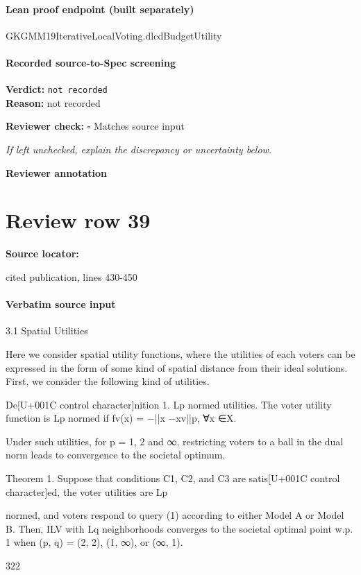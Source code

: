 \documentclass[10pt]{article}
\newcommand{\reviewerbox}{%
  \par\noindent\fbox{\parbox{0.96\linewidth}{\rule{0pt}{0.38in}}}\par
}
\newcommand{\reviewmatch}[1]{%
  \par\noindent\textbf{Reviewer check:} $\square$\; #1\par
  \noindent\emph{If left unchecked, explain the discrepancy or uncertainty below.}\par
}
\begin{document}
\paragraph{Lean proof endpoint (built separately)}\begin{ReviewVerbatim}
GKGMM19IterativeLocalVoting.dlcdBudgetUtility
\end{ReviewVerbatim}

\paragraph{Recorded source-to-Spec screening}
\textbf{Verdict:} \texttt{not recorded}
\\
\textbf{Reason:} not recorded
\reviewmatch{Matches source input}
\noindent\textbf{Reviewer annotation}\par
\reviewerbox
\clearpage
\hypertarget{source-claim-0c5fe9d4037e07b4}{}
\section*{Review row 39}
\textbf{Source locator:} {\footnotesize\raggedright cited publication, lines 430-\allowbreak{}450\par}
\paragraph{Verbatim source input}
\begin{ReviewVerbatim}
3.1 Spatial Utilities

Here we consider spatial utility functions, where the utilities of each voters can be expressed
in the form of some kind of spatial distance from their ideal solutions. First, we consider
the following kind of utilities.

De[U+001C control character]nition 1. Lp normed utilities. The voter utility function is Lp normed if fv(x) =
−||x −xv||p, ∀x ∈X.

Under such utilities, for p = 1, 2 and ∞, restricting voters to a ball in the dual norm
leads to convergence to the societal optimum.

Theorem 1. Suppose that conditions C1, C2, and C3 are satis[U+001C control character]ed, the voter utilities are Lp

normed, and voters respond to query (1) according to either Model A or Model B. Then,
ILV with Lq neighborhoods converges to the societal optimal point w.p. 1 when (p, q) = (2, 2),
(1, ∞), or (∞, 1).

322
\end{ReviewVerbatim}
\end{document}
